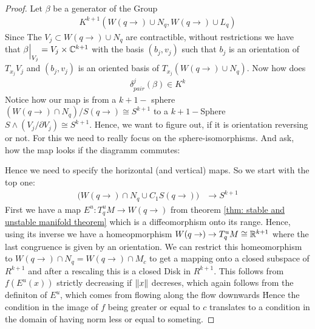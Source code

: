 \begin{proof}
 Let $\beta$ be a generator of the Group 
 \begin{align*}
     K^{k+1}(W(q\to)\cup N_q,W(q\to)\cup L_q)
 \end{align*} Since The $V_j\subset W(q\to)\cup N_q$ are contractible, without restrictions we have that $\beta\einsch{V_j}=V_j\times \C^{k+1}$ with the basis $(b_j,v_j)$ such that $b_j$ is an orientation of $T_{x_j}V_j$ and $(b_j,v_j)$ is an oriented basis of $T_{x_j} (W(q\to)\cup N_q)$. Now how does 
 \begin{align*}
     \delta^j_{pair} (\beta)\in K^{k}
 \end{align*}
Notice how our map is from a $k+1-$ sphere $(W(q\to)\cap N_q)\big/ S(q\to )\cong S^{k+1}$ to a $k+1-$Sphere $S\wedge (V_j\big/ \partial V_j)\cong S^{k+1}$. Hence, we want to figure out, if it is orientation reversing or not. For this we need to really focus on the sphere-isomorphisms. And ask, how the map looks if the diagramm commutes:
\begin{center}
\end{center}
Hence we need to specify the horizontal (and vertical) maps. 
So we start with the top one:
\begin{align*}
	\big(W(q\to )\cap N_q \cup C_1 S(q\to ) \big)& \to S^{k+1}
\end{align*}
First we have a map $E^u:T^u_qM \to W(q\to)$ from theorem \ref{thm: stable and unstable manifold theorem} which is a diffeomorphism onto its range. Hence, using its inverse we have a homeopmorphism $W(q \to) \to T^u_qM \cong \mathbb{R}^{k+1}$ where the last congruence is given by an orientation. We can restrict this homeomorphism to $W(q\to)\cap N_q=W(q\to)\cap M_c$ to get a mapping onto a closed subspace of $R^{k+1}$ and after a rescaling this is a closed Disk in $R^{k+1}$. This follows from $f(E^u(x))$ strictly decreasing if $\left\lVert x\right\rVert$ decreses, which again follows from the definiton of $E^u$, which comes from \glqq flowing along the flow downwards \grqq\. Hence the condition in the image of $f$ being greater or equal to $c$ translates to a condition in the domain of having norm less or equal to someting. 




\end{proof}
